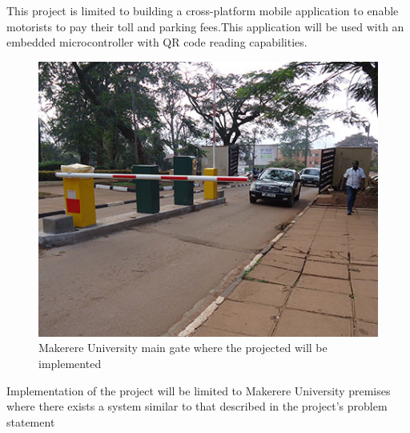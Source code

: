 This project is limited to building a cross-platform mobile application to enable motorists to pay their toll and parking fees.This application will be used with an embedded microcontroller with QR code reading capabilities.

\begin{figure}
    \begin{center}
        \includegraphics[scale = 0.6]{images/gate}
        \caption{Makerere University main gate where the projected will be implemented}
    \end{center}
\end{figure}
Implementation of the project will be limited to Makerere University premises where there exists a system similar to that described in the project’s problem statement